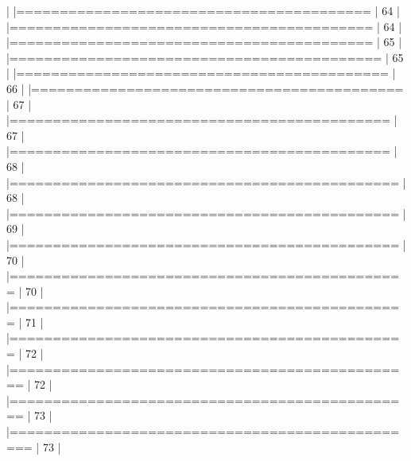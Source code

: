 \documentclass[10pt]{article}
\newenvironment{CodeChunk}{}{}
\begin{document}
\begin{CodeChunk}
\begin{CodeChunk}
\begin{CodeOutput}
  |                                                                       
  |=========================================                        |  64%
  |                                                                       
  |==========================================                       |  64%
  |                                                                       
  |==========================================                       |  65%
  |                                                                       
  |===========================================                      |  65%
  |                                                                       
  |===========================================                      |  66%
  |                                                                       
  |===========================================                      |  67%
  |                                                                       
  |============================================                     |  67%
  |                                                                       
  |============================================                     |  68%
  |                                                                       
  |=============================================                    |  68%
  |                                                                       
  |=============================================                    |  69%
  |                                                                       
  |=============================================                    |  70%
  |                                                                       
  |==============================================                   |  70%
  |                                                                       
  |==============================================                   |  71%
  |                                                                       
  |==============================================                   |  72%
  |                                                                       
  |===============================================                  |  72%
  |                                                                       
  |===============================================                  |  73%
  |                                                                       
  |================================================                 |  73%
  |                                                                       

\end{CodeOutput}
\end{CodeChunk}
\end{CodeChunk}
\end{document}
